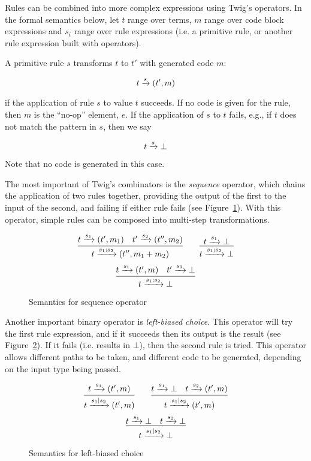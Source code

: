 Rules can be combined into more complex expressions using Twig's operators. In
the formal semantics below, let $t$ range over terms, $m$ range over code block
expressions and $s_i$ range over rule expressions (i.e. a primitive rule, or
another rule expression built with operators).

A primitive rule $s$ transforms $t$ to $t'$ with generated code $m$:

\[
t \xrightarrow{s} (t',m)
\]

if the application of rule $s$ to value $t$ succeeds. If no code is given for
the rule, then $m$ is the ``no-op'' element, $e$. If the application of $s$ to
$t$ fails, e.g., if $t$ does not match the pattern in $s$, then we say

\[
t \xrightarrow{s} \bot
\]

Note that no code is generated in this case.

The most important of Twig's combinators is the \emph{sequence} operator,
which chains the application of two rules together, providing the output of
the first to the input of the second, and failing if either rule fails (see
Figure~\ref{semantics:sequence}). With this operator, simple rules can be
composed into multi-step transformations.

\begin{figure}[ht]
\label{semantics:sequence}
\[
\infer{t \arr{s_1;s_2} (t'',m_1+m_2)}{t \arr{s_1} (t',m_1) \quad t' \arr{s_2} (t'',m_2)}
\qquad 
\infer{t \arr{s_1;s_2} \bot}{t \arr{s_1} \bot}
\]
\[
\infer{t \arr{s_1;s_2} \bot}{t \arr{s_1} (t',m) \quad t' \arr{s_2} \bot}
\]
\caption{Semantics for sequence operator}
\end{figure}

Another important binary operator is \emph{left-biased choice}. This operator
will try the first rule expression, and if it succeeds then its output is the
result (see Figure~\ref{semantics:choice}). If it fails (i.e. results in
$\bot$), then the second rule is tried. This operator allows different paths
to be taken, and different code to be generated, depending on the input type
being passed.

\begin{figure}[ht]
\label{semantics:choice}
\[
\infer{t \arr{s_1|s_2} (t',m)}{t \arr{s_1} (t',m)}
\qquad 
\infer{t \arr{s_1|s_2} (t',m)}{t \arr{s_1} \bot \quad t \arr{s_2} (t',m)}
\]
\[
\infer{t \arr{s_1|s_2} \bot}{t \arr{s_1} \bot \quad t \arr{s_2} \bot}
\]
\caption{Semantics for left-biased choice}
\end{figure}

